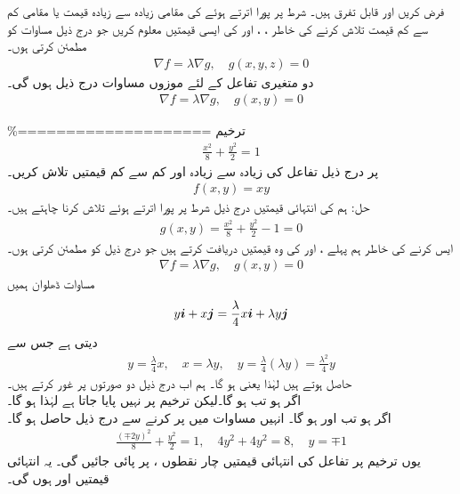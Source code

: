 فرض کریں  اور  قابل تفرق ہیں۔ شرط   پر پورا اترتے ہوئے  کی مقامی زیادہ سے زیادہ قیمت یا  مقامی کم سے کم قیمت تلاش کرنے کی خاطر  ، ،  اور  کی ایسی قیمتیں معلوم کریں جو درج ذیل مساوات کو مطمئن کرتی  ہوں۔ 
\begin{align*}
\nabla f=\lambda \nabla g,\quad g(x,y,z)=0
\end{align*}
دو متغیری تفاعل  کے لئے موزوں مساوات درج ذیل ہوں گی۔
\begin{align*}
\nabla f=\lambda \nabla g,\quad g(x,y)=0
\end{align*}

\%====================
ترخیم
\begin{align*}
\frac{x^2}{8}+\frac{y^2}{2}=1
\end{align*}
پر درج ذیل تفاعل کی زیادہ سے زیادہ اور کم سے کم قیمتیں تلاش کریں۔
\begin{align*}
f(x,y)=xy
\end{align*}
حل:\quad
ہم  کی انتہائی قیمتیں  درج ذیل شرط  پر پورا اترتے ہوئے تلاش کرنا چاہتے ہیں۔
\begin{align*}
g(x,y)=\frac{x^2}{8}+\frac{y^2}{2}-1=0
\end{align*}
ایس کرنے کی خاطر ہم پہلے ،  اور  کی وہ قیمتیں دریافت کرتے ہیں جو درج ذیل کو مطمئن کرتی ہوں۔
\begin{align*}
\nabla f=\lambda \nabla g,\quad g(x,y)=0
\end{align*}
مساوات ڈھلوان ہمیں
\begin{align*}
y{\boldsymbol{i}}+x{\boldsymbol{j}}=\frac{\lambda}{4}x{\boldsymbol{i}}+\lambda y{\boldsymbol{j}}
\end{align*}
دیتی ہے جس سے
\begin{align*}
y=\frac{\lambda}{4}x,\quad x=\lambda y, \quad y=\frac{\lambda}{4}(\lambda y)=\frac{\lambda^2}{4}y
\end{align*}
حاصل ہوتے ہیں لہٰذا  یعنی  ہو گا۔ ہم اب درج ذیل دو صورتوں پر غور کرتے ہیں۔\\
  اگر  ہو تب  ہو گا۔لیکن  ترخیم پر نہیں پایا جاتا ہے لہٰذا  ہو گا۔\\
  اگر  ہو تب  اور  ہو گا۔ انہیں مساوات  میں پر کرنے سے درج ذیل حاصل ہو گا۔
\begin{align*}
\frac{(\mp 2y)^2}{8}+\frac{y^2}{2}=1,\quad 4y^2+4y^2=8,\quad y=\mp 1
\end{align*}
یوں ترخیم پر تفاعل  کی انتہائی قیمتیں چار نقطوں  ،  پر پائی جائیں گی۔ یہ انتہائی قیمتیں  اور  ہوں گی۔ 
